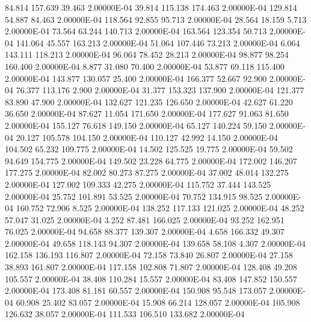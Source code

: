     84.814   157.639    39.463  2.00000E-04
    39.814   115.138   174.463  2.00000E-04
   129.814    54.887    84.463  2.00000E-04
   118.564    92.855    95.713  2.00000E-04
    28.564    18.159     5.713  2.00000E-04
    73.564    63.244   140.713  2.00000E-04
   163.564   123.354    50.713  2.00000E-04
   141.064    45.557   163.213  2.00000E-04
    51.064   107.446    73.213  2.00000E-04
     6.064   143.111   118.213  2.00000E-04
    96.064    78.452    28.213  2.00000E-04
    98.877    98.254   160.400  2.00000E-04
     8.877    31.080    70.400  2.00000E-04
    53.877    69.118   115.400  2.00000E-04
   143.877   130.057    25.400  2.00000E-04
   166.377    52.667    92.900  2.00000E-04
    76.377   113.176     2.900  2.00000E-04
    31.377   153.323   137.900  2.00000E-04
   121.377    83.890    47.900  2.00000E-04
   132.627   121.235   126.650  2.00000E-04
    42.627    61.220    36.650  2.00000E-04
    87.627    11.054   171.650  2.00000E-04
   177.627    91.063    81.650  2.00000E-04
   155.127    76.618   149.150  2.00000E-04
    65.127   140.224    59.150  2.00000E-04
    20.127   105.578   104.150  2.00000E-04
   110.127    42.992    14.150  2.00000E-04
   104.502    65.232   109.775  2.00000E-04
    14.502   125.525    19.775  2.00000E-04
    59.502    94.649   154.775  2.00000E-04
   149.502    23.228    64.775  2.00000E-04
   172.002   146.207   177.275  2.00000E-04
    82.002    80.273    87.275  2.00000E-04
    37.002    48.014   132.275  2.00000E-04
   127.002   109.333    42.275  2.00000E-04
   115.752    37.444   143.525  2.00000E-04
    25.752   101.891    53.525  2.00000E-04
    70.752   134.915    98.525  2.00000E-04
   160.752    72.906     8.525  2.00000E-04
   138.252   117.133   121.025  2.00000E-04
    48.252    57.047    31.025  2.00000E-04
     3.252    87.481   166.025  2.00000E-04
    93.252   162.951    76.025  2.00000E-04
    94.658    88.377   139.307  2.00000E-04
     4.658   166.332    49.307  2.00000E-04
    49.658   118.143    94.307  2.00000E-04
   139.658    58.108     4.307  2.00000E-04
   162.158   136.193   116.807  2.00000E-04
    72.158    73.840    26.807  2.00000E-04
    27.158    38.893   161.807  2.00000E-04
   117.158   102.808    71.807  2.00000E-04
   128.408    49.208   105.557  2.00000E-04
    38.408   110.284    15.557  2.00000E-04
    83.408   147.852   150.557  2.00000E-04
   173.408    81.181    60.557  2.00000E-04
   150.908    95.548   173.057  2.00000E-04
    60.908    25.402    83.057  2.00000E-04
    15.908    66.214   128.057  2.00000E-04
   105.908   126.632    38.057  2.00000E-04
   111.533   106.510   133.682  2.00000E-04
